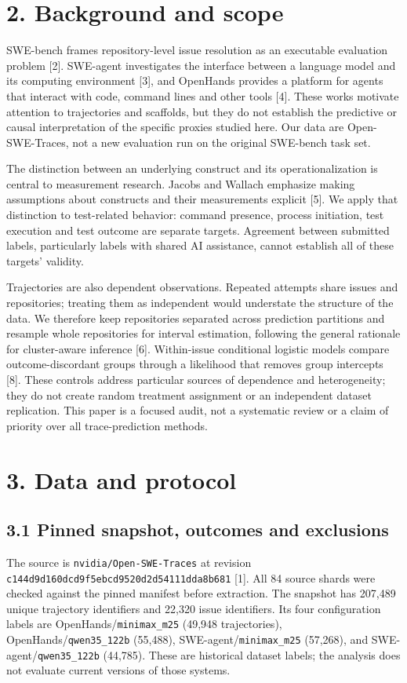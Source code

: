 \documentclass[10pt,a4paper]{article}
\begin{document}
\section{2. Background and scope}
SWE-bench frames repository-level issue resolution as an executable evaluation problem [2]. SWE-agent investigates the interface between a language model and its computing environment [3], and OpenHands provides a platform for agents that interact with code, command lines and other tools [4]. These works motivate attention to trajectories and scaffolds, but they do not establish the predictive or causal interpretation of the specific proxies studied here. Our data are Open-SWE-Traces, not a new evaluation run on the original SWE-bench task set.

The distinction between an underlying construct and its operationalization is central to measurement research. Jacobs and Wallach emphasize making assumptions about constructs and their measurements explicit [5]. We apply that distinction to test-related behavior: command presence, process initiation, test execution and test outcome are separate targets. Agreement between submitted labels, particularly labels with shared AI assistance, cannot establish all of these targets' validity.

Trajectories are also dependent observations. Repeated attempts share issues and repositories; treating them as independent would understate the structure of the data. We therefore keep repositories separated across prediction partitions and resample whole repositories for interval estimation, following the general rationale for cluster-aware inference [6]. Within-issue conditional logistic models compare outcome-discordant groups through a likelihood that removes group intercepts [8]. These controls address particular sources of dependence and heterogeneity; they do not create random treatment assignment or an independent dataset replication. This paper is a focused audit, not a systematic review or a claim of priority over all trace-prediction methods.

\section{3. Data and protocol}
\subsection{3.1 Pinned snapshot, outcomes and exclusions}
The source is \texttt{nvidia/Open-SWE-Traces} at revision \nolinkurl{c144d9d160dcd9f5ebcd9520d2d54111dda8b681} [1]. All 84 source shards were checked against the pinned manifest before extraction. The snapshot has 207,489 unique trajectory identifiers and 22,320 issue identifiers. Its four configuration labels are OpenHands/\texttt{minimax\_m25} (49,948 trajectories), OpenHands/\texttt{qwen35\_122b} (55,488), SWE-agent/\texttt{minimax\_m25} (57,268), and SWE-agent/\texttt{qwen35\_122b} (44,785). These are historical dataset labels; the analysis does not evaluate current versions of those systems.
\end{document}
